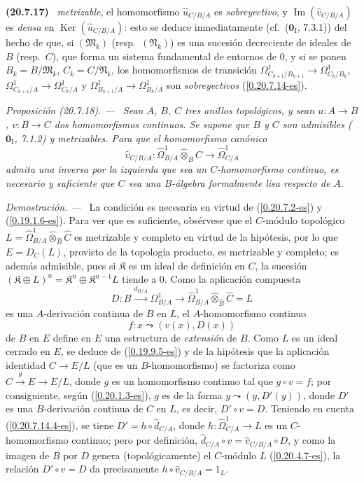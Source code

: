 \documentclass[10pt,oneside]{book}
\makeatletter
\newcommand{\sref}[1]{\textup{(\ref{#1})}}
\newcommand{\setmanualcurrentlabel}[1]{\def\@currentlabel{#1}}
\newcommand{\oldpage}[2][]{%
  \setcounter{footnote}{0}%
  \marginpar{\scriptsize\textbf{#1}~|~#2}\ignorespaces}
\newenvironment{env}[1][]{\setmanualcurrentlabel{#1}\par\medskip\noindent\textbf{(#1)}\ }{\par}
\newenvironment{proposition}[1][]{%
  \setmanualcurrentlabel{#1}\par\medskip\noindent\itshape Proposición (#1). ---\ }{\par}
\newenvironment{proof}{%
  \par\medskip\noindent\textit{Demostración. ---\ }}{\par}
\makeatother
\begin{document}
\begin{env}[20.7.17]
\emph{metrizable}, el homomorfismo $\widehat u_{C/B/A}$ es \emph{sobreyectivo},
y $\operatorname{Im}(\widehat v_{C/B/A})$ es \emph{densa} en
$\operatorname{Ker}(\widehat u_{C/B/A})$: esto se deduce inmediatamente
(cf.\ ($\mathbf{0}_{\mathrm I}$, 7.3.1)) del hecho de que, si
$(\mathfrak{M}_k)$ (resp.\ $(\mathfrak{N}_k)$) es una sucesión decreciente
de ideales de $B$ (resp.\ $C$), que forma un sistema fundamental de entornos
de $0$, y si se ponen $B_k=B/\mathfrak{M}_k$, $C_k=C/\mathfrak{N}_k$, los
homomorfismos de transición
$\Omega^1_{C_{k+1}/B_{k+1}}\to\Omega^1_{C_k/B_k}$,
$\Omega^1_{C_{k+1}/A}\to\Omega^1_{C_k/A}$ y
$\Omega^1_{B_{k+1}/A}\to\Omega^1_{B_k/A}$ son \emph{sobreyectivos}
\sref{0.20.7.14-es}.
\end{env}

\begin{proposition}[20.7.18]
\label{0.20.7.18-es}
Sean $A$, $B$, $C$ tres anillos topológicos, y sean $u:A\to B$, $v:B\to C$
dos homomorfismos continuos. Se supone que $B$ y $C$ son admisibles
\textup{($\mathbf{0}_{\mathrm I}$, 7.1.2)} y metrizables. Para que el homomorfismo
canónico
\[
  \widehat v_{C/B/A}:\widehat{\Omega}^1_{B/A}
  \widehat\otimes_B C\to\widehat{\Omega}^1_{C/A}
\]
admita una inversa por la izquierda que sea un $C$-homomorfismo continuo, es
necesario y suficiente que $C$ sea una $B$-álgebra formalmente lisa respecto
de $A$.
\end{proposition}

\begin{proof}
La condición es necesaria en virtud de \sref{0.20.7.2-es} y
\sref{0.19.1.6-es}. Para ver que es suficiente, obsérvese que el $C$-módulo
topológico
$L=\widehat{\Omega}^1_{B/A}\widehat\otimes_{\widehat B}\widehat C$ es
metrizable y
\oldpage[0\textsubscript{IV-1}]{153}
completo en virtud de la hipótesis, por lo que
$E=D_C(L)$, provisto de la topología producto, es metrizable y completo; es
además admisible, pues si $\mathfrak K$ es un ideal de definición en $C$, la
sucesión $(\mathfrak K\oplus L)^n=\mathfrak K^n\oplus\mathfrak K^{n-1}L$
tiende a $0$. Como la aplicación compuesta
\[
  D:B\xrightarrow{d_{B/A}}\Omega^1_{B/A}\to
  \widehat{\Omega}^1_{B/A}\widehat\otimes_{\widehat B}\widehat C=L
\]
es una $A$-derivación continua de $B$ en $L$, el $A$-homomorfismo continuo
\[
  f:x\leadsto(v(x),D(x))
\]
de $B$ en $E$ define en $E$ una estructura de \emph{extensión} de $B$. Como $L$ es
un ideal cerrado en $E$, se deduce de \sref{0.19.9.5-es} y de la hipótesis que
la aplicación identidad $C\to E/L$ (que es un $B$-homomorfismo) se factoriza
como $C\xrightarrow{g}E\to E/L$, donde $g$ es un homomorfismo continuo tal
que $g\circ v=f$; por consiguiente, según \sref{0.20.1.3-es}, $g$ es de la
forma $y\leadsto(y,D'(y))$, donde $D'$ es una $B$-derivación continua de $C$ en
$L$, es decir, $D'\circ v=D$. Teniendo en cuenta \sref{0.20.7.14.4-es}, se
tiene $D'=h\circ\widehat d_{C/A}$, donde
$h:\widehat{\Omega}^1_{C/A}\to L$ es un $C$-homomorfismo continuo; pero por
definición, $\widehat d_{C/A}\circ v=\widehat v_{C/B/A}\circ D$, y como la
imagen de $B$ por $D$ genera (topológicamente) el $C$-módulo $L$
\sref{0.20.4.7-es}, la relación $D'\circ v=D$ da precisamente
$h\circ\widehat v_{C/B/A}=1_L$.
\end{proof}
\end{document}
